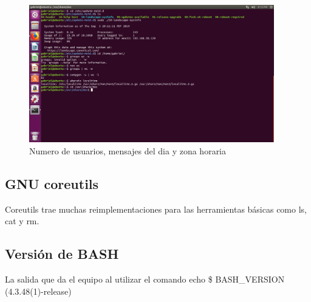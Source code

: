 \documentclass[
  letterpaper, 
  maincolor=black,
  sectioncolor=black!90,
  subsectioncolor=black!70,
  itemtextcolor=black!40,
]{fortysecondscv}
\begin{document}
            \begin{figure}[H]
                \centering
                \includegraphics[trim= 0 250 400 0,clip,width=0.95\textwidth]{img/men.jpg}
                \caption{Numero de usuarios, mensajes del dia y zona horaria}
                \label{fig:my_label}
            \end{figure}
        \subsection{GNU coreutils}
            Coreutils trae muchas reimplementaciones para las herramientas básicas como ls, cat y rm.
        \subsection{Versión de BASH}
            La salida que da el equipo al utilizar el comando echo \$ BASH\_VERSION (4.3.48(1)-release)
\end{document}
